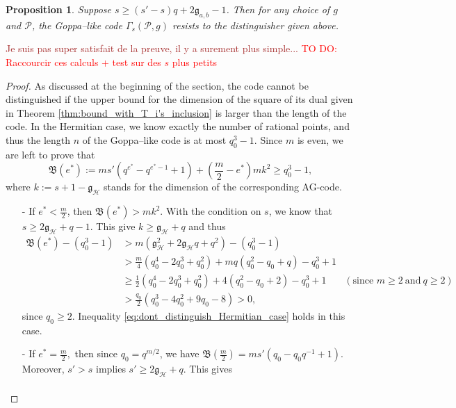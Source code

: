 \documentclass[a4paper]{article}
\newtheorem{proposition}[thm]{Proposition}
\theoremstyle{definition}
\theoremstyle{remark}
\newcommand{\calP}{\mathcal{P}}
\newcommand{\calH}{\mathcal{H}}
\newcommand\TODO[1]{\textcolor{red}{TO DO: #1}}
\newcommand\mathieu[1]{\textcolor{brown}{#1}}
\begin{document}
\begin{proposition} \label{prop:Hermitian_Goppa_like_are_secured}
    Suppose $s \geq (s'-s)q+2\mathfrak{g}_{a,b}-1$. Then for any choice of $g$ and $\calP$, the Goppa--like code $\Gamma_s(\calP,g)$ resists to the distinguisher given above.
\end{proposition}
\mathieu{Je suis pas super satisfait de la preuve, il y a surement plus simple...}
\TODO{Raccourcir ces calculs + test sur des $s$ plus petits}
\begin{proof}
    As discussed at the beginning of the section, the code cannot be distinguished if the upper bound for the dimension of the square of its dual given in Theorem \ref{thm:bound_with_T_i's_inclusion} is larger than the length of the code. In the Hermitian case, we know exactly the number of rational points, and thus the length $n$ of the Goppa--like code is at most $q_0^3-1$. Since $m$ is even, we are left to prove that 
    \begin{equation} \label{eq:dont_distinguish_Hermitian_case}
    \mathfrak{B}(e^*) := ms'(q^{e^*}-q^{e^*-1}+1) + \left( \frac{m}{2}-e^*\right)mk^2 \geq q_0^3-1,
    \end{equation}
    where $k := s+1-\mathfrak{g}_{\calH}$ stands  for the dimension of the corresponding AG-code.
    \begin{itemize}
        \item [-] If $e^* < \frac{m}{2}$, then $\mathfrak{B}(e^*) > mk^2$. With the condition on $s$, we know that $s \geq 2\mathfrak{g}_{\calH}+q-1$. This give $k \geq \mathfrak{g}_{\calH}+q$ and thus
        \begin{align*}
\mathfrak{B}(e^*) - (q_0^3-1) 
&> m(\mathfrak{g}_{\calH}^2+2\mathfrak{g}_{\calH}q+q^2)-(q_0^3-1)&\\
& > \frac{m}{4}(q_0^4-2q_0^3+q_0^2) + mq(q_0^2-q_0+q) -q_0^3+1 &\\
& \geq \frac{1}{2}(q_0^4-2q_0^3+q_0^2)+4(q_0^2-q_0+2)-q_0^3+1 \quad &(\text{since } m\geq 2 \ \mathrm{and} \ q\geq 2)&\\
& > \frac{q_0}{2} (q_0^3-4q_0^2+9q_0-8) > 0,&
        \end{align*}
        since $q_0 \geq 2$. Inequality \eqref{eq:dont_distinguish_Hermitian_case} holds in this case.
        \item[-] If $e^* = \frac{m}{2},$ then since $q_0=q^{m/2}$, we have $\mathfrak{B}\left(\frac{m}{2}\right) = ms'(q_0-q_0q^{-1}+1)$. Moreover, $s'>s$ implies $s' \geq 2\mathfrak{g}_{\calH}+q$. This gives
        \begin{align*}

\end{align*}
\end{itemize}
\end{proof}
\end{document}
